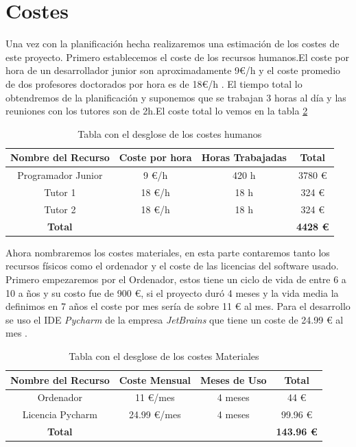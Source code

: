 \section{Costes}
Una vez con la planificación hecha realizaremos una estimación de los costes de este proyecto. Primero establecemos el coste de los recursos humanos.El coste por hora de un desarrollador junior son aproximadamente 9€/h \cite{saljun} y el coste promedio de dos profesores doctorados por hora es de 18€/h \cite{saldoc}. El tiempo total lo obtendremos de la planificación y suponemos que se trabajan 3 horas al día y las reuniones con los tutores son de 2h.El coste total lo vemos en la tabla \ref{tabcospes}

\begin{table}[hp!]
   \centering
  \begin{tabular}{c|c|c|c}
  \rowcolor{udcpink!25}
  \textbf{Nombre del Recurso} & \textbf{Coste por hora} & \textbf{Horas Trabajadas} & \textbf{Total}\\\hline
  
  Programador Junior & 9 €/h & 420 h & 3780 € \\
  Tutor 1 & 18 €/h & 18 h & 324 € \\
  Tutor 2 & 18 €/h & 18 h & 324 €  \\
  \textbf{Total}  & & & \textbf{4428 €}\\

  \end{tabular}

  \caption{Tabla con el desglose de los costes humanos}
  \label{tabcospes}


\end{table}

  Ahora nombraremos los costes materiales, en esta parte contaremos tanto los recursos físicos como el ordenador y el coste de las licencias del software usado. Primero empezaremos por el Ordenador, estos tiene un ciclo de vida de entre 6 a 10 a ños y su costo fue de 900 €, si el proyecto duró 4 meses y la vida media la definimos en 7 años el coste por mes sería de sobre 11 € al mes. Para el desarrollo se uso el IDE \textit{Pycharm} de la empresa \textit{JetBrains}  que tiene un coste de 24.99 € al mes \cite{costjet}.

\begin{table}[hp!]
   \centering
  \begin{tabular}{c|c|c|c}
  \rowcolor{udcpink!25}
  \textbf{Nombre del Recurso} & \textbf{Coste Mensual} & \textbf{Meses de Uso} & \textbf{Total}\\\hline
  
  Ordenador & 11 €/mes & 4 meses & 44 € \\
  Licencia Pycharm & 24.99 €/mes & 4 meses & 99.96 € \\
  \textbf{Total}  & & & \textbf{143.96 €} \\
  \end{tabular}

  \caption{Tabla con el desglose de los costes Materiales}
  \label{tabcospes}
\end{table}


